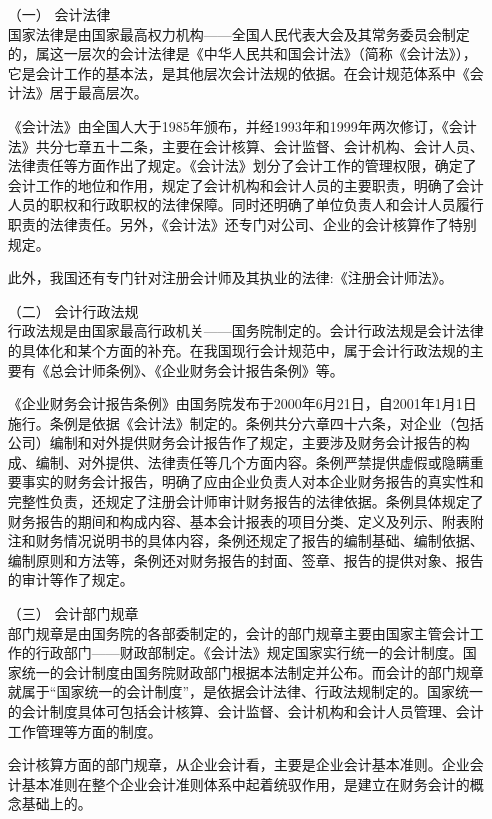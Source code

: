 				\begin{enumerate}
					\item[（一）] 会计法律 \\
						国家法律是由国家最高权力机构——全国人民代表大会及其常务委员会制定的，属这一层次的会计法律是《中华人民共和国会计法》（简称《会计法》），它是会计工作的基本法，是其他层次会计法规的依据。在会计规范体系中《会计法》居于最高层次。
						
						《会计法》由全国人大于1985年颁布，并经1993年和1999年两次修订，《会计法》共分七章五十二条，主要在会计核算、会计监督、会计机构、会计人员、法律责任等方面作出了规定。《会计法》划分了会计工作的管理权限，确定了会计工作的地位和作用，规定了会计机构和会计人员的主要职责，明确了会计人员的职权和行政职权的法律保障。同时还明确了单位负责人和会计人员履行职责的法律责任。另外，《会计法》还专门对公司、企业的会计核算作了特别规定。
						
						此外，我国还有专门针对注册会计师及其执业的法律:《注册会计师法》。
					\item[（二）] 会计行政法规 \\
						行政法规是由国家最高行政机关——国务院制定的。会计行政法规是会计法律的具体化和某个方面的补充。在我国现行会计规范中，属于会计行政法规的主要有《总会计师条例》、《企业财务会计报告条例》等。
						
						《企业财务会计报告条例》由国务院发布于2000年6月21日，自2001年1月1日施行。条例是依据《会计法》制定的。条例共分六章四十六条，对企业（包括公司）编制和对外提供财务会计报告作了规定，主要涉及财务会计报告的构成、编制、对外提供、法律责任等几个方面内容。条例严禁提供虚假或隐瞒重要事实的财务会计报告，明确了应由企业负责人对本企业财务报告的真实性和完整性负责，还规定了注册会计师审计财务报告的法律依据。条例具体规定了财务报告的期间和构成内容、基本会计报表的项目分类、定义及列示、附表附注和财务情况说明书的具体内容，条例还规定了报告的编制基础、编制依据、编制原则和方法等，条例还对财务报告的封面、签章、报告的提供对象、报告的审计等作了规定。
					\item[（三）] 会计部门规章 \\
						部门规章是由国务院的各部委制定的，会计的部门规章主要由国家主管会计工作的行政部门——财政部制定。《会计法》规定国家实行统一的会计制度。国家统一的会计制度由国务院财政部门根据本法制定并公布。而会计的部门规章就属于“国家统一的会计制度”，是依据会计法律、行政法规制定的。国家统一的会计制度具体可包括会计核算、会计监督、会计机构和会计人员管理、会计工作管理等方面的制度。
						
						会计核算方面的部门规章，从企业会计看，主要是企业会计基本准则。企业会计基本准则在整个企业会计准则体系中起着统驭作用，是建立在财务会计的概念基础上的。
						

\end{enumerate}
